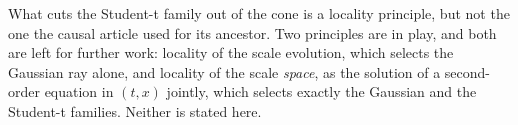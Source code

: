 What cuts the Student-t family out of the cone is a locality principle, but not the one the
causal article used for its ancestor. Two principles are in play, and both are left for further
work: locality of the scale evolution, which selects the Gaussian ray alone, and locality of the
scale \emph{space}, as the solution of a second-order equation in $(t,x)$ jointly, which selects
exactly the Gaussian and the Student-t families. Neither is stated here.

